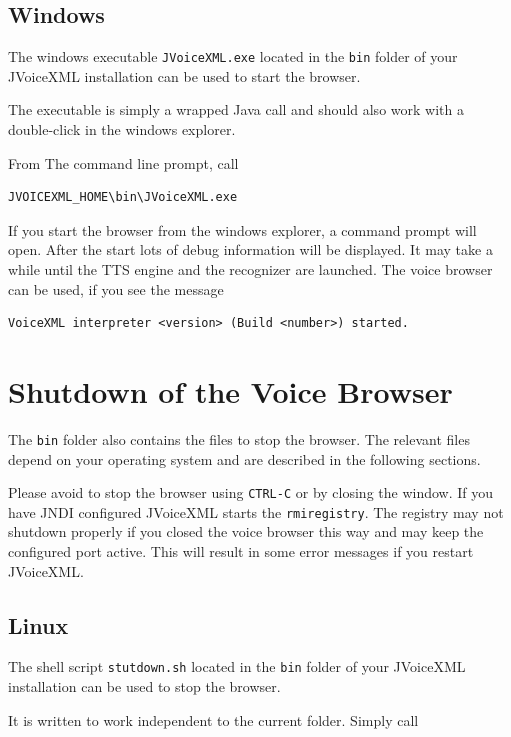 \documentclass[11pt,a4paper]{article}
\begin{document}
\subsection{Windows}

The windows executable \texttt{JVoiceXML.exe} located in the \texttt{bin}
folder of your JVoiceXML installation can be used to start the browser.

The executable is simply a wrapped Java call and should also work with a
double-click in the windows explorer.

From The command line prompt, call

\begin{lstlisting}
JVOICEXML_HOME\bin\JVoiceXML.exe
\end{lstlisting}

If you start the browser from the windows explorer, a command prompt will open.
After the start lots of debug information will be displayed.
It may take a while until the TTS engine and the recognizer are launched.
The voice browser can be used, if you see the message

\begin{lstlisting}
VoiceXML interpreter <version> (Build <number>) started.
\end{lstlisting}

\section{Shutdown of the Voice Browser}

The \texttt{bin} folder also contains the files to stop the browser. The
relevant files depend on your operating system and are described in the following
sections.

Please avoid to stop the browser using \lstinline{CTRL-C} or by closing the
window. If you have JNDI configured JVoiceXML starts the \lstinline{rmiregistry}. The
registry may not shutdown properly if you closed the voice browser this way and may keep the
configured port active. This will result in some error messages if you restart
JVoiceXML.

\subsection{Linux}

The shell script \texttt{stutdown.sh} located in the \texttt{bin} folder
of your JVoiceXML installation can be used to stop the browser.

It is written to work independent to the current folder. Simply call
\end{document}
